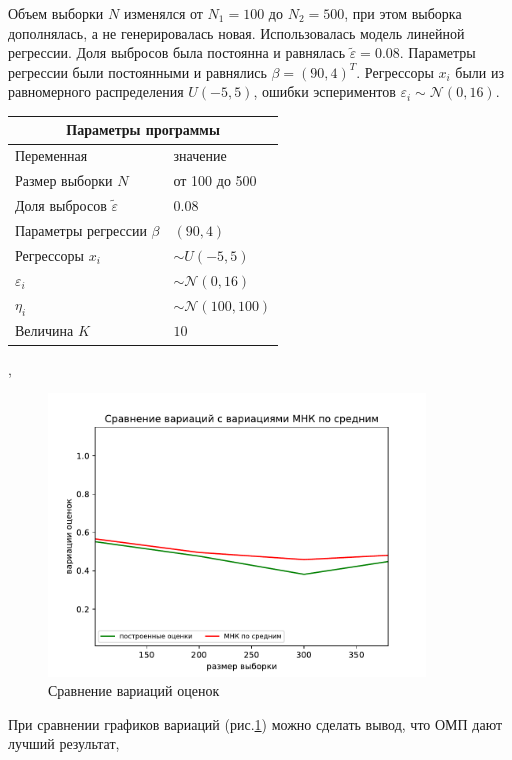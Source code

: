 Объем выборки $N$ изменялся от $N_1=100$ до $N_2=500$, при этом выборка дополнялась, а не генерировалась новая. Использовалась модель линейной регрессии. Доля выбросов была постоянна и равнялась $\widetilde{\varepsilon}=0.08$. Параметры регрессии были постоянными и равнялись $\beta=(90,4)^T$. 
Регрессоры $x_i$ были из равномерного распределения $U(-5,5)$, ошибки эспериментов $\varepsilon_i\sim \mathcal{N}(0,16)$.

\begin{center}
    \label{tab1}
    \begin{tabular}{|p{5cm}|p{5cm}|}
        \hline
        \multicolumn{2}{|c|}{Параметры программы} \\
        \hline
        Переменная&значение\\
        \hline
        Размер выборки $N$& от 100 до 500\\
        \hline
        Доля выбросов $\widetilde{\varepsilon}$& 0.08\\
        \hline
        Параметры регрессии $\beta$& $(90,4)$\\
        \hline
        Регрессоры $x_i$ & $\sim U(-5,5)$\\
        \hline
        $\varepsilon_i$&$\sim \mathcal{N}(0,16)$\\
        \hline
        $\eta_i$&$\sim \mathcal{N}(100,100)$\\
        \hline
        Величина $K$  &$10$\\
        \hline
    \end{tabular},
\end{center}
\begin{figure}[h!]
    \centering
    \includegraphics[width=100mm]{../images/OLS_GEM.pdf}
    \caption{Сравнение вариаций оценок\label{overflow}}
    \label{pic0}
\end{figure}
При сравнении графиков вариаций (рис.\ref{pic0}) можно сделать вывод, что ОМП дают лучший результат, 

